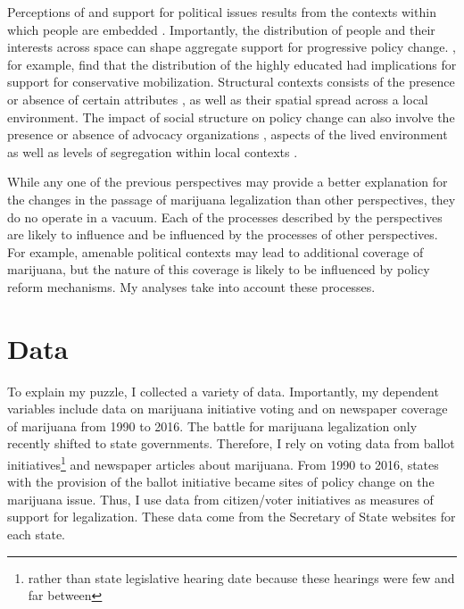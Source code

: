 Perceptions of and support for political issues results from the contexts within which people are embedded \citep{blau_1977a,blau_1977b,mcveigh_and_diaz_2009}. Importantly, the distribution of people and their interests across space can shape aggregate support for progressive policy change. \citet{mcveigh_et_al_2014}, for example, find that the distribution of the highly educated had implications for support for conservative mobilization. Structural contexts consists of the presence or absence of certain attributes \citep{blau_1977a,blau_1977b,blau_and_duncan_1967}, as well as their spatial spread across a local environment. The impact of social structure on policy change can also involve the presence or absence of advocacy organizations \citep{vannjr_2018,soule_and_olzak_2004}, aspects of the lived environment \citep{olzak_and_soule_2009} as well as levels of segregation within local contexts \citep{andrews_and_seguin_2015,olzak_et_al_1994}. 







While any one of the previous perspectives may provide a better explanation for the changes in the passage of marijuana legalization than other perspectives, they do no operate in a vacuum. Each of the processes described by the perspectives are likely to influence and be influenced by the processes of other perspectives. For example, amenable political contexts may lead to additional coverage of marijuana, but the nature of this coverage is likely to be influenced by policy reform mechanisms. My analyses take into account these processes.


\section{Data}


To explain my puzzle, I collected a variety of data. Importantly, my dependent variables include data on marijuana initiative voting and on newspaper coverage of marijuana from 1990 to 2016. The battle for marijuana legalization only recently shifted to state governments. Therefore, I rely on voting data from ballot initiatives\footnote{rather than state legislative hearing date because these hearings were few and far between} and newspaper articles about marijuana. From 1990 to 2016, states with the provision of the ballot initiative became sites of policy change on the marijuana issue. Thus, I use data from citizen/voter initiatives as measures of support for legalization. These data come from the Secretary of State websites for each state. 

